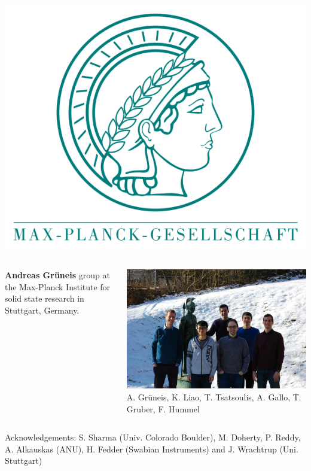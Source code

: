 \begin{frame}{}
  \includegraphics[width=.2\textwidth]{images/max_planck.png}\\
  \begin{columns}
    \begin{column}{0.5\textwidth}
      \textbf{Andreas Grüneis} group at the Max-Planck Institute for solid
      state research in Stuttgart, Germany.
    \end{column}
    \begin{column}{0.5\textwidth}
      \includegraphics[width=\textwidth]{images/group_photo.jpg}\\
      {\tiny
        A. Grüneis, K. Liao, T. Tsatsoulis, A. Gallo, T. Gruber, F. Hummel
      }
    \end{column}
  \end{columns}
  Acknowledgements:
  S. Sharma (Univ. Colorado Boulder), M. Doherty, P. Reddy, A. Alkauskas (ANU),
  H. Fedder (Swabian Instruments) and J.  Wrachtrup (Uni. Stuttgart)
\end{frame}
